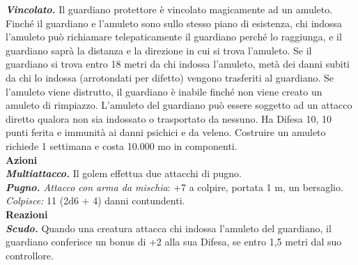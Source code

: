 \begin{multicols}{2}
\emph{\textbf{Vincolato.}} Il guardiano protettore è vincolato magicamente ad un amuleto. Finché il guardiano e l'amuleto sono sullo stesso piano di esistenza, chi indossa l'amuleto può richiamare telepaticamente il guardiano perché lo raggiunga, e il guardiano saprà la distanza e la direzione in cui si trova l'amuleto. Se il guardiano si trova entro 18 metri da chi indossa l'amuleto, metà dei danni subiti da chi lo indossa (arrotondati per difetto) vengono trasferiti al guardiano. Se l'amuleto viene distrutto, il guardiano è inabile finché non viene creato un amuleto di rimpiazzo. L'amuleto del guardiano può essere soggetto ad un attacco diretto qualora non sia indossato o trasportato da nessuno. Ha Difesa 10, 10 punti ferita e immunità ai danni psichici e da veleno. Costruire un amuleto richiede 1 settimana e costa 10.000 mo in componenti.\\
\smallskip\textbf{Azioni}\\
\emph{\textbf{Multiattacco.}} Il golem effettua due attacchi di pugno.\\
\emph{\textbf{Pugno.} Attacco con arma da mischia}: +7 a colpire, portata 1 m, un bersaglio.\\
\emph{Colpisce:} 11 (2d6 + 4) danni contundenti.\\
\textbf{Reazioni}\\
\emph{\textbf{Scudo.}} Quando una creatura attacca chi indossa l'amuleto del guardiano, il guardiano conferisce un bonus di +2 alla sua Difesa, se entro 1,5 metri dal suo controllore.\\


\end{multicols}

